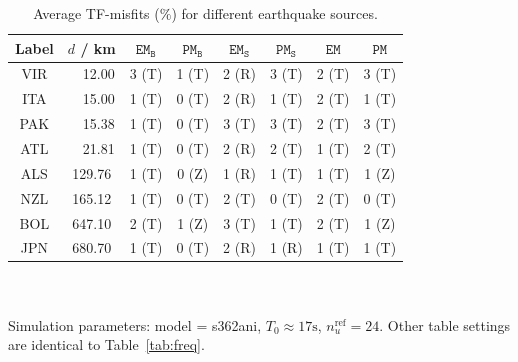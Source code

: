 \documentclass[extra]{gji}
\begin{document}
\begin{table}
\begin{minipage}{\columnwidth}
\caption{Average TF-misfits ($\%$) for different earthquake sources.}
\label{tab:cmt}
\setlength{\tabcolsep}{.255cm}
\begin{tabular*}{\textwidth}{cccccccc}
Label & $d$ / km & $\mathtt{EM_B}$ & $\mathtt{PM_B}$ & 
$\mathtt{EM_S}$ & $\mathtt{PM_S}$ & $\mathtt{EM}$ & $\mathtt{PM}$\\[2pt]
\hline
VIR & \ \ 12.00 &
3 {\scriptsize(T)} &
1 {\scriptsize(T)} &
2 {\scriptsize(R)} &
3 {\scriptsize(T)} &
2 {\scriptsize(T)} &
3 {\scriptsize(T)} \\[2pt]
ITA & \ \ 15.00 &
1 {\scriptsize(T)} &
0 {\scriptsize(T)} &
2 {\scriptsize(R)} &
1 {\scriptsize(T)} &
2 {\scriptsize(T)} &
1 {\scriptsize(T)} \\[2pt]
PAK & \ \ 15.38 &
1 {\scriptsize(T)} &
0 {\scriptsize(T)} &
3 {\scriptsize(T)} &
3 {\scriptsize(T)} &
2 {\scriptsize(T)} &
3 {\scriptsize(T)} \\[2pt]
ATL & \ \ 21.81 &
1 {\scriptsize(T)} &
0 {\scriptsize(T)} &
2 {\scriptsize(R)} &
2 {\scriptsize(T)} &
1 {\scriptsize(T)} &
2 {\scriptsize(T)} \\[2pt]
ALS & 129.76 &
1 {\scriptsize(T)} &
0 {\scriptsize(Z)} &
1 {\scriptsize(R)} &
1 {\scriptsize(T)} &
1 {\scriptsize(T)} &
1 {\scriptsize(Z)} \\[2pt]
NZL & 165.12 &
1 {\scriptsize(T)} &
0 {\scriptsize(T)} &
2 {\scriptsize(T)} &
0 {\scriptsize(T)} &
2 {\scriptsize(T)} &
0 {\scriptsize(T)} \\[2pt]
BOL & 647.10 &
2 {\scriptsize(T)} &
1 {\scriptsize(Z)} &
3 {\scriptsize(T)} &
1 {\scriptsize(T)} &
2 {\scriptsize(T)} &
1 {\scriptsize(Z)} \\[2pt]
JPN & 680.70 &
1 {\scriptsize(T)} &
0 {\scriptsize(T)} &
2 {\scriptsize(R)} &
1 {\scriptsize(R)} &
1 {\scriptsize(T)} &
1 {\scriptsize(T)} \\[2pt]
\hline
\end{tabular*}
\\\\
Simulation parameters: model = s362ani, $T_0\approx17\text{s}$, 
$n_u^\text{ref}=24$. Other table settings are identical to 
Table~\ref{tab:freq}.
\end{minipage}
\end{table}
\end{document}
